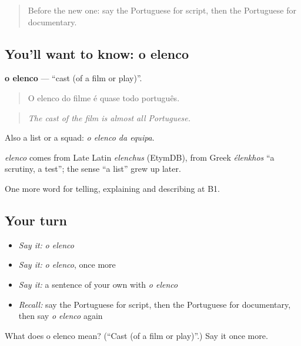 \begin{quote}
Before the new one: say the Portuguese for script, then the Portuguese for documentary.
\end{quote}

\subsection*{You'll want to know: o elenco}
\textbf{o elenco} — \textquotedblleft{}cast (of a film or play)\textquotedblright{}.

\begin{quote}
O elenco do filme é quase todo português.
\end{quote}

\begin{quote}
\emph{The cast of the film is almost all Portuguese.}
\end{quote}

Also a list or a squad: \emph{o elenco da equipa}.

\begin{cousinweb}
\emph{elenco} comes from Late Latin \emph{elenchus} (EtymDB), from Greek \emph{élenkhos} \textquotedblleft{}a scrutiny, a test\textquotedblright{}; the sense \textquotedblleft{}a list\textquotedblright{} grew up later.
\end{cousinweb}

\begin{grammarlens}[title={What you've built}]
One more word for telling, explaining and describing at B1.
\end{grammarlens}

\subsection*{Your turn}
\begin{itemize}
\raggedright
  \item \emph{Say it:} \emph{o elenco}
  \item \emph{Say it:} \emph{o elenco}, once more
  \item \emph{Say it:} a sentence of your own with \emph{o elenco}
  \item \emph{Recall:} say the Portuguese for script, then the Portuguese for documentary, then say \emph{o elenco} again
\end{itemize}

\begin{tcolorbox}[breakable,colback=teal!4,colframe=teal!35!black,title={Before you move on}]
What does o elenco mean? (\textquotedblleft{}Cast (of a film or play)\textquotedblright{}.) Say it once more.
\end{tcolorbox}
